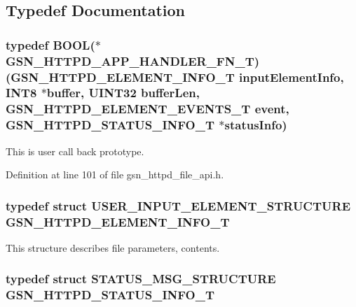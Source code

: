 \subsection{Typedef Documentation}
\hypertarget{a00511_aa8074d4aaa1ef8e6443148ee81fd9aea}{
\subsubsection[{GSN\_\-HTTPD\_\-APP\_\-HANDLER\_\-FN\_\-T}]{\setlength{\rightskip}{0pt plus 5cm}typedef {\bf BOOL}($\ast$ {\bf GSN\_\-HTTPD\_\-APP\_\-HANDLER\_\-FN\_\-T})({\bf GSN\_\-HTTPD\_\-ELEMENT\_\-INFO\_\-T} inputElementInfo, {\bf INT8} $\ast$buffer, {\bf UINT32} bufferLen, {\bf GSN\_\-HTTPD\_\-ELEMENT\_\-EVENTS\_\-T} event, {\bf GSN\_\-HTTPD\_\-STATUS\_\-INFO\_\-T} $\ast$statusInfo)}}
\label{a00511_aa8074d4aaa1ef8e6443148ee81fd9aea}


This is user call back prototype. 



Definition at line 101 of file gsn\_\-httpd\_\-file\_\-api.h.

\hypertarget{a00511_a43b1190102f272453bf5f9e12fae8565}{
\subsubsection[{GSN\_\-HTTPD\_\-ELEMENT\_\-INFO\_\-T}]{\setlength{\rightskip}{0pt plus 5cm}typedef struct {\bf USER\_\-INPUT\_\-ELEMENT\_\-STRUCTURE} {\bf GSN\_\-HTTPD\_\-ELEMENT\_\-INFO\_\-T}}}
\label{a00511_a43b1190102f272453bf5f9e12fae8565}


This structure describes file parameters, contents. 

\hypertarget{a00511_a7104dada96f24f3d0e996e3a8ad59b19}{
\subsubsection[{GSN\_\-HTTPD\_\-STATUS\_\-INFO\_\-T}]{\setlength{\rightskip}{0pt plus 5cm}typedef struct {\bf STATUS\_\-MSG\_\-STRUCTURE} {\bf GSN\_\-HTTPD\_\-STATUS\_\-INFO\_\-T}}}
\label{a00511_a7104dada96f24f3d0e996e3a8ad59b19}


